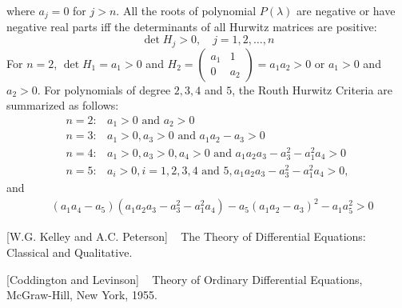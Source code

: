 \documentclass[leqno,DIV=calc,paper=a4,fontsize=11pt]{article}
\theoremstyle{definition}
\theoremstyle{plain}
\theoremstyle{remark}
\begin{document}
where $a_j=0$ for $j>n$. All the roots of polynomial $P(\lambda)$ are negative or have negative real parts iff the determinants of all Hurwitz matrices are positive:
\[\det H_j>0,\quad j=1,2,\ldots,n\]
For $n=2$, $\det H_1=a_1>0$ and $H_2=
\begin{pmatrix}
a_1  & 1  \\
0  & a_2
\end{pmatrix}=a_1a_2>0$
or $a_1>0$ and $a_2>0$.
For polynomials of degree $2,3,4$ and $5$, the Routh Hurwitz Criteria are summarized as follows:
\begin{align}
n=2: &a_1>0 \mbox{ and } a_2>0\\
n=3: &a_1>0,a_3>0 \mbox{ and } a_1a_2-a_3>0\\
n=4: &a_1>0,a_3>0,a_4>0 \mbox{ and } a_1a_2a_3-a_3^2-a_1^2a_4>0\\
n=5: &a_i>0,i=1,2,3,4 \mbox{ and } 5,  a_1a_2a_3-a_3^2-a_1^2a_4>0,
\end{align}
and
\begin{align}
&(a_1a_4-a_5)(a_1a_2a_3-a_3^2-a_1^2a_4)-a_5(a_1a_2-a_3)^2-a_1a_5^2>0
\end{align}
\newpage
\begin{thebibliography}{9}

[W.G. Kelley and A.C. Peterson] ~
The Theory of Differential Equations: Classical and Qualitative.

[Coddington and Levinson] ~
Theory of Ordinary Differential Equations, McGraw-Hill, New York, 1955.

\end{thebibliography}
\end{document}

